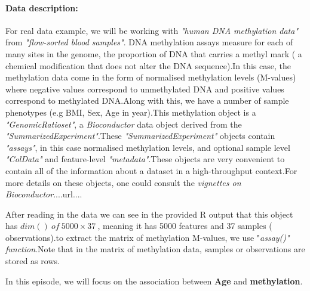 \documentclass[12pt]{report}
\begin{document}
{	\paragraph{Data description:}
	For real data example, we will be working with \textit{"human DNA methylation data"} from \textit{"flow-sorted blood samples"}. DNA methylation assays measure for each of many sites in the genome, the proportion of DNA that carries a methyl mark ( a chemical modification that does not alter the DNA sequence).In this case, the methylation data come in the form of normalised methylation levels (M-values) where negative values correspond to unmethylated DNA and positive values correspond to methylated DNA.Along with this, we have a number of sample phenotypes (e.g BMI, Sex, Age in year).This methylation object is a \textit{"GenomicRatioset"}, a \textit{Bioconductor}\cite{nref31} data object derived from the \textit{"SummarizedExperiment"}\cite{nref32}.These \textit{"SummarizedExperiment"} objects contain  \textit{"assays"}, in this case normalised methylation levels, and optional sample level \textit{"ColData"} and feature-level \textit{"metadata"}.These objects are very convenient to contain all of the information about a dataset in a high-throughput context.For more details on these objects, one could consult the \textit{vignettes on Bioconductor}....url....
	
	After reading in the data we can see in the provided R output that this object has $dim() \ of\ 5000\times37\ $, meaning it has 5000 features and 37 samples ( observations).to extract the matrix of methylation M-values, we use "\textit{assay()" function}.Note that in the matrix of methylation data, samples or observations are stored as rows.
	
	In this episode, we will focus on the association between \textbf{Age} and \textbf{methylation}.
}
\end{document}
